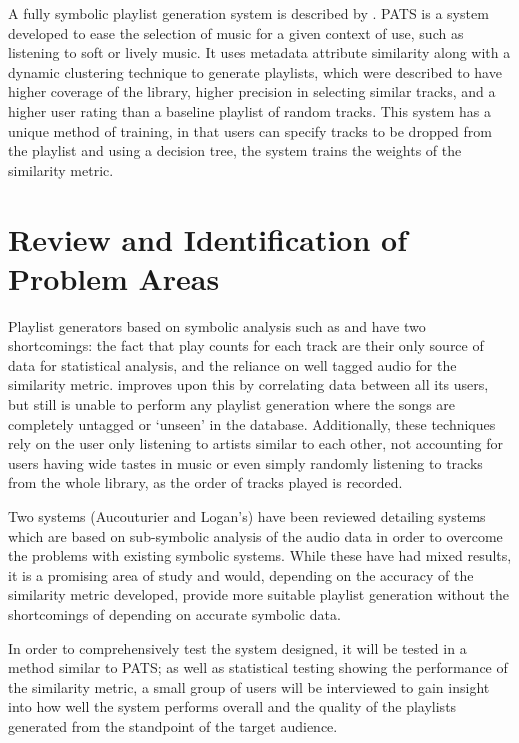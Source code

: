 A fully symbolic playlist generation system is described by \citet{Pauws2002}. PATS is a system developed to ease the selection of music for a given context of use, such as listening to soft or lively music. It uses metadata attribute similarity along with a dynamic clustering technique to generate playlists, which were described to have higher coverage of the library, higher precision in selecting similar tracks, and a higher user rating than a baseline playlist of random tracks. This system has a unique method of training, in that users can specify tracks to be dropped from the playlist and using a decision tree, the system trains the weights of the similarity metric. 
\section{Review and Identification of Problem Areas}
Playlist generators based on symbolic analysis such as  and  have two shortcomings: the fact that play counts for each track are their only source of data for statistical analysis, and the reliance on well tagged audio for the similarity metric.  improves upon this by correlating data between all its users, but still is unable to perform any playlist generation where the songs are completely untagged or `unseen' in the database. Additionally, these techniques rely on the user only listening to artists similar to each other, not accounting for users having wide tastes in music or even simply randomly listening to tracks from the whole library, as the order of tracks played is recorded.

Two systems (Aucouturier and Logan's) have been reviewed detailing systems which are based on sub-symbolic analysis of the audio data in order to overcome the problems with existing symbolic systems. While these have had mixed results, it is a promising area of study and would, depending on the accuracy of the similarity metric developed, provide more suitable playlist generation without the shortcomings of depending on accurate symbolic data.

In order to comprehensively test the system designed, it will be tested in a method similar to PATS; as well as statistical testing showing the performance of the similarity metric, a small group of users will be interviewed to gain insight into how well the system performs overall and the quality of the playlists generated from the standpoint of the target audience.
